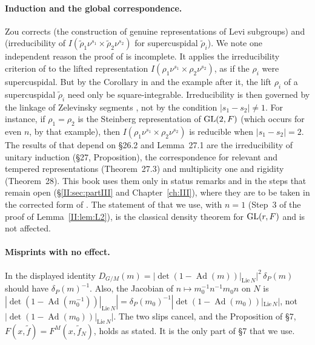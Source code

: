 \paragraph{Induction and the global correspondence.} Zou \cite{Zo23} corrects \cite[\S26.2]{FK86} (the construction of genuine representations of Levi subgroups) and \cite[Lemma~27.1]{FK86} (irreducibility of $I(\tilde\rho_1\nu^{s_1}\times\tilde\rho_2\nu^{s_2})$ for supercuspidal $\tilde\rho_i$). We note one independent reason the proof of \cite[Lemma~27.1(1)]{FK86} is incomplete. It applies the irreducibility criterion of \cite{BZ77} to the lifted representation $I(\rho_1\nu^{s_1}\times\rho_2\nu^{s_2})$, as if the $\rho_i$ were supercuspidal. But by the Corollary in \cite[\S26]{FK86} and the example after it, the lift $\rho_i$ of a supercuspidal $\tilde\rho_i$ need only be square-integrable. Irreducibility is then governed by the linkage of Zelevinsky segments \cite{Zel80}, not by the condition $|s_1-s_2|\ne1$. For instance, if $\rho_1=\rho_2$ is the Steinberg representation of $\operatorname{GL}(2,F)$ (which occurs for even $n$, by that example), then $I(\rho_1\nu^{s_1}\times\rho_2\nu^{s_2})$ is reducible when $|s_1-s_2|=2$. The results of \cite{FK86} that depend on \S26.2 and Lemma~27.1 are the irreducibility of unitary induction (\S27, Proposition), the correspondence for relevant and tempered representations (Theorem~27.3) and multiplicity one and rigidity (Theorem~28). This book uses them only in status remarks and in the steps that remain open (\S\ref{II:sec:partIII} and Chapter~\ref{ch:III}), where they are to be taken in the corrected form of \cite{Zo23}. The statement of \cite[Proposition~27.3]{FK86} that we use, with $n=1$ (Step~3 of the proof of Lemma~\ref{II:lem:L2}), is the classical density theorem for $\operatorname{GL}(r,F)$ and is not affected.

\paragraph{Misprints with no effect.} In \cite[\S7]{FK86} the displayed identity $D_{G/M}(m)=|\det(1-\operatorname{Ad}(m))|_{\mathrm{Lie}\,N}|^2\,\delta_P(m)$ should have $\delta_P(m)^{-1}$. Also, the Jacobian of $n\mapsto m_0^{-1}n^{-1}m_0n$ on $N$ is $|\det(1-\operatorname{Ad}(m_0^{-1}))|_{\mathrm{Lie}\,N}|=\delta_P(m_0)^{-1}|\det(1-\operatorname{Ad}(m_0))|_{\mathrm{Lie}\,N}|$, not $|\det(1-\operatorname{Ad}(m_0))|_{\mathrm{Lie}\,N}|$. The two slips cancel, and the Proposition of \S7, $F(x,\tilde f)=F^M(x,\tilde f_N)$, holds as stated. It is the only part of \S7 that we use.

